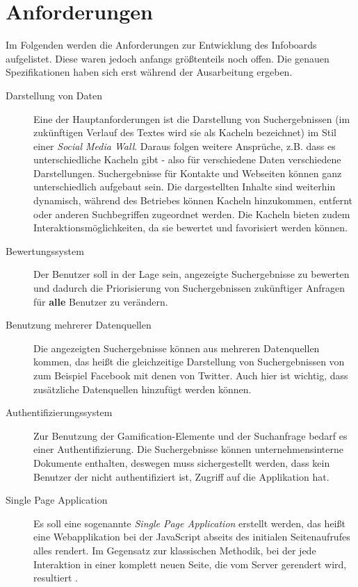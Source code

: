 \documentclass[12pt,twoside]{book}
\begin{document}
\section{Anforderungen}

Im Folgenden werden die Anforderungen zur Entwicklung des Infoboards aufgelistet. Diese waren jedoch anfangs größtenteils noch offen. Die genauen Spezifikationen haben sich erst während der Ausarbeitung ergeben.

\begin{description}

\item[Darstellung von Daten]

Eine der Hauptanforderungen ist die Darstellung von Suchergebnissen (im zukünftigen Verlauf des Textes wird sie als Kacheln bezeichnet) im Stil einer \textit{Social Media Wall}. Daraus folgen weitere Ansprüche, z.B. dass es unterschiedliche Kacheln gibt - also für verschiedene Daten verschiedene Darstellungen. Suchergebnisse für Kontakte und Webseiten können ganz unterschiedlich aufgebaut sein. Die dargestellten Inhalte sind weiterhin dynamisch, während des Betriebes können Kacheln hinzukommen, entfernt oder anderen Suchbegriffen zugeordnet werden. Die Kacheln bieten zudem Interaktionsmöglichkeiten, da sie bewertet und favorisiert werden können.

\item[Bewertungssystem]

  Der Benutzer soll in der Lage sein, angezeigte Suchergebnisse zu bewerten und dadurch die Priorisierung von Suchergebnissen zukünftiger Anfragen für \textbf{alle} Benutzer zu verändern.

\item[Benutzung mehrerer Datenquellen]
  Die angezeigten Suchergebnisse können aus mehreren Datenquellen kommen, das heißt die gleichzeitige Darstellung von Suchergebnissen von zum Beispiel Facebook mit denen von Twitter. Auch hier ist wichtig, dass zusätzliche Datenquellen hinzufügt werden können.

\item[Authentifizierungssystem]
	Zur Benutzung der Gamification-Elemente und der Suchanfrage bedarf es einer Authentifizierung. Die Suchergebnisse können unternehmensinterne Dokumente enthalten, deswegen muss sichergestellt werden, dass kein Benutzer der nicht authentifiziert ist, Zugriff auf die Applikation hat.

\item[Single Page Application]
  Es soll eine sogenannte \textit{Single Page Application} erstellt werden, das heißt eine Webapplikation bei der JavaScript abseits des initialen Seitenaufrufes alles rendert. Im Gegensatz zur klassischen Methodik, bei der jede Interaktion in einer komplett neuen Seite, die vom Server gerendert wird, resultiert \cite{mesbah2007migrating}.


\end{description}
\end{document}

